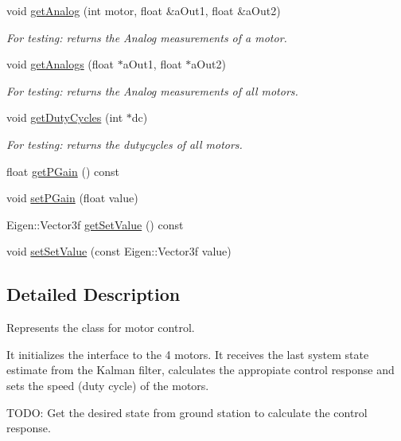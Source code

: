 \begin{DoxyCompactItemize}
void \hyperlink{class_u_s_u_1_1_motor_control_a3304fd7022bf2468859a0d2edae0e2f0}{get\-Analog} (int motor, float \&a\-Out1, float \&a\-Out2)
\begin{DoxyCompactList}\small\item\em \-For testing\-: returns the \-Analog measurements of a motor. \end{DoxyCompactList}\item 
void \hyperlink{class_u_s_u_1_1_motor_control_a195cfcad9f3e9ca8cbde54340aad620c}{get\-Analogs} (float $\ast$a\-Out1, float $\ast$a\-Out2)
\begin{DoxyCompactList}\small\item\em \-For testing\-: returns the \-Analog measurements of all motors. \end{DoxyCompactList}\item 
void \hyperlink{class_u_s_u_1_1_motor_control_a16a8f713f050fffc56321f82267bc7cc}{get\-Duty\-Cycles} (int $\ast$dc)
\begin{DoxyCompactList}\small\item\em \-For testing\-: returns the dutycycles of all motors. \end{DoxyCompactList}\item 
float \hyperlink{class_u_s_u_1_1_motor_control_ad4cb1e34afc71cbd161c66d4794784cc}{get\-P\-Gain} () const 
\item 
void \hyperlink{class_u_s_u_1_1_motor_control_a0a959a8b3ab68e7ad095dcab4059d469}{set\-P\-Gain} (float value)
\item 
\-Eigen\-::\-Vector3f \hyperlink{class_u_s_u_1_1_motor_control_a849e3f3b265777135492c2ebfc3fe814}{get\-Set\-Value} () const 
\item 
void \hyperlink{class_u_s_u_1_1_motor_control_a9de3a4f1b2e39e1f4cfb3e822d5d74bc}{set\-Set\-Value} (const \-Eigen\-::\-Vector3f value)
\end{DoxyCompactItemize}


\subsection{\-Detailed \-Description}
\-Represents the class for motor control. 

\-It initializes the interface to the 4 motors. \-It receives the last system state estimate from the \-Kalman filter, calculates the appropiate control response and sets the speed (duty cycle) of the motors.

\-T\-O\-D\-O\-: \-Get the desired state from ground station to calculate the control response. 

